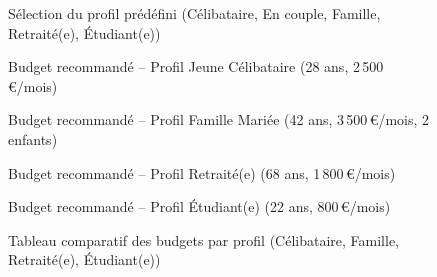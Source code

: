 \begin{figure}[H]
    \centering
    \caption{Sélection du profil prédéfini (Célibataire, En couple, Famille, Retraité(e), Étudiant(e))}
    \label{fig:maquette-profils-liste-ann}
\end{figure}

\begin{figure}[H]
    \centering
    \caption{Budget recommandé -- Profil Jeune Célibataire (28 ans, 2\,500\,€/mois)}
    \label{fig:maquette-budget-celibataire-ann}
\end{figure}

\begin{figure}[H]
    \centering
    \caption{Budget recommandé -- Profil Famille Mariée (42 ans, 3\,500\,€/mois, 2 enfants)}
    \label{fig:maquette-budget-famille-ann}
\end{figure}

\begin{figure}[H]
    \centering
    \caption{Budget recommandé -- Profil Retraité(e) (68 ans, 1\,800\,€/mois)}
    \label{fig:maquette-budget-retraite-ann}
\end{figure}

\begin{figure}[H]
    \centering
    \caption{Budget recommandé -- Profil Étudiant(e) (22 ans, 800\,€/mois)}
    \label{fig:maquette-budget-etudiant-ann}
\end{figure}

\begin{figure}[H]
    \centering
    \caption{Tableau comparatif des budgets par profil (Célibataire, Famille, Retraité(e), Étudiant(e))}
    \label{fig:maquette-tableau-comparatif-ann}
\end{figure}